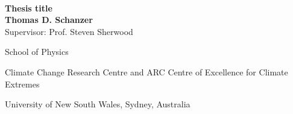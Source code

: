 \documentclass[../main.tex]{subfiles}
\begin{document}
\begin{titlepage}
\vfill~

\begin{center}
    {\Huge \textbf{%
        Thesis title
    }} \\
    \vspace{0.75cm}
    {\Large\textbf{Thomas D. Schanzer}} \\
    \vspace{6pt}
    {\large Supervisor: Prof. Steven Sherwood} \\
    \vspace{0.75cm}
    {\large%
        School of Physics

        Climate Change Research Centre and
        ARC Centre of Excellence for Climate Extremes

        University of New South Wales, Sydney, Australia
    }
\end{center}
\vfill
\end{titlepage}

\clearpage
\tableofcontents
\end{document}
